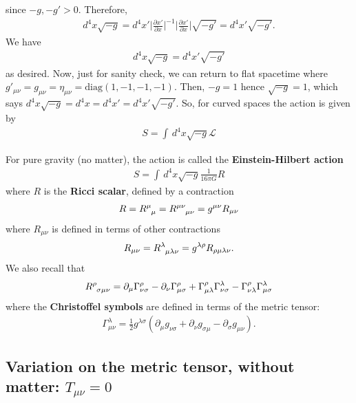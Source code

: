 \documentclass{book}
\numberwithin{equation}{section}
\theoremstyle{definition}
\newcommand{\p}{\partial}
\newcommand{\lag}{\mathcal{L}}
\newcommand{\f}[2]{\frac{#1}{#2}}
\newcommand{\lp}{\left(}
\newcommand{\rp}{\right)}
\begin{document}
since $-g, -g' > 0$. Therefore,
\begin{align}
d^4 x \sqrt{-g} = d^4 x' \bigg\vert \f{\p x'}{\p x} \bigg\vert^{-1} \bigg\vert \f{\p x'}{\p x} \bigg\vert \sqrt{-g'} = d^4 x' \sqrt{-g'}.
\end{align} 
We have 
\begin{align}
d^4x\sqrt{-g} = d^4x' \sqrt{-g'}
\end{align}
as desired. Now, just for sanity check, we can return to flat spacetime where $g'_{\mu\nu} = g_{\mu\nu} = \eta_{\mu\nu} = \text{diag}(1,-1,-1,-1)$. Then, $-g = 1$ hence $\sqrt{-g} = 1$, which says $d^4x \sqrt{-g} = d^4x = d^4x' = d^4x'\sqrt{-g'}$. So, for curved spaces the action is given by
\begin{align}
\boxed{S = \int \,d^4x \sqrt{-g}\lag}
\end{align}


For pure gravity (no matter), the action is called the \textbf{Einstein-Hilbert action}
\begin{align}
\boxed{S = \int \, d^4x \sqrt{-g}\f{1}{16\pi G}R}
\end{align}
where $R$ is the \textbf{Ricci scalar}, defined by a contraction
\begin{align}
R = \tensor{R}{^\mu_\mu} = \tensor{R}{^{\mu\nu}_{\mu\nu}} = g^{\mu\nu} R_{\mu\nu} 
\end{align}
where $R_{\mu\nu}$ is defined in terms of other contractions
\begin{align}
R_{\mu\nu} = \tensor{R}{^\lambda_{\mu\lambda\nu}} = g^{\lambda \rho} R_{\rho\mu\lambda\nu}.
\end{align}
We also recall that
\begin{align}
\tensor{R}{^\rho_{\sigma\mu\nu}} = \p_\mu \Gamma^\rho_{\nu\sigma} - \p_\nu \Gamma^\rho_{\mu\sigma} + \Gamma^\rho _{\mu\lambda}\Gamma^\lambda_{\nu\sigma} - \Gamma^\rho_{\nu\lambda} \Gamma^\lambda_{\mu\sigma}
\end{align}
where the \textbf{Christoffel symbols} are defined in terms of the metric tensor:
\begin{align}
\Gamma^\lambda_{\mu\nu} = \f{1}{2}g^{\lambda\sigma}\lp \p_\mu g_{\nu\sigma} + \p_\nu g_{\sigma\mu} - \p_\sigma g_{\mu\nu} \rp.
\end{align}










\subsection{Variation on the metric tensor, without matter: $T_{\mu\nu} = 0$}
\end{document}
